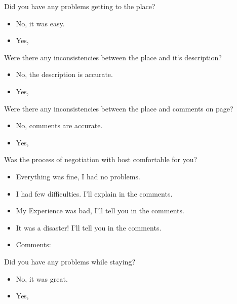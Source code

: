 Did you have any problems getting to the place?
\begin{itemize}
	\item No, it was easy.
    \item Yes, \underline{\hspace{8cm}}
\end{itemize}
\vspace{0.2cm}

Were there any inconsistencies between the place and it`s description?
\begin{itemize}
	\item No, the description is accurate.
    \item Yes, \underline{\hspace{8cm}}
\end{itemize}
\vspace{0.2cm}

Were there any inconsistencies between the place and comments on page?
\begin{itemize}
	\item No, comments are accurate.
    \item Yes, \underline{\hspace{8cm}}
\end{itemize}
\vspace{0.2cm}

Was the process of negotiation with host comfortable for you?
\begin{itemize}
 \item Everything was fine, I had no problems.
 \item I had few difficulties. I'll explain in the comments.
 \item My Experience was bad, I'll tell you in the comments.
 \item It was a disaster! I'll tell you in the comments.
 \item Comments: \underline{\hspace{8cm}}
\end{itemize}
\vspace{0.2cm}

Did you have any problems while staying?
\begin{itemize}
	\item No, it was great.
    \item Yes, \underline{\hspace{8cm}}
\end{itemize}
